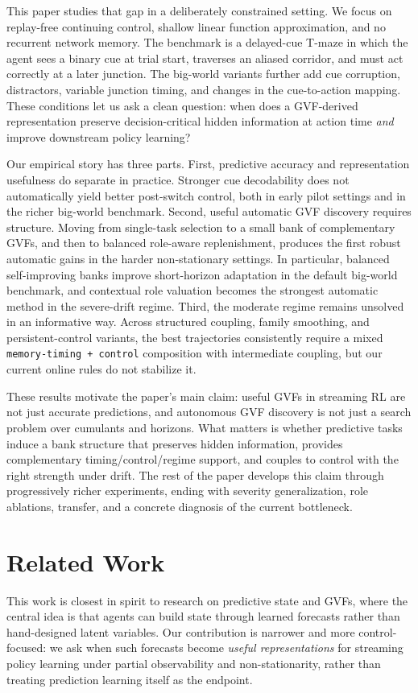 \documentclass[11pt]{article}
\begin{document}
This paper studies that gap in a deliberately constrained setting. We focus on replay-free continuing control, shallow linear function approximation, and no recurrent network memory. The benchmark is a delayed-cue T-maze in which the agent sees a binary cue at trial start, traverses an aliased corridor, and must act correctly at a later junction. The big-world variants further add cue corruption, distractors, variable junction timing, and changes in the cue-to-action mapping. These conditions let us ask a clean question: when does a GVF-derived representation preserve decision-critical hidden information at action time \emph{and} improve downstream policy learning?

Our empirical story has three parts. First, predictive accuracy and representation usefulness do separate in practice. Stronger cue decodability does not automatically yield better post-switch control, both in early pilot settings and in the richer big-world benchmark. Second, useful automatic GVF discovery requires structure. Moving from single-task selection to a small bank of complementary GVFs, and then to balanced role-aware replenishment, produces the first robust automatic gains in the harder non-stationary settings. In particular, balanced self-improving banks improve short-horizon adaptation in the default big-world benchmark, and contextual role valuation becomes the strongest automatic method in the severe-drift regime. Third, the moderate regime remains unsolved in an informative way. Across structured coupling, family smoothing, and persistent-control variants, the best trajectories consistently require a mixed \texttt{memory-timing + control} composition with intermediate coupling, but our current online rules do not stabilize it.

These results motivate the paper's main claim: useful GVFs in streaming RL are not just accurate predictions, and autonomous GVF discovery is not just a search problem over cumulants and horizons. What matters is whether predictive tasks induce a bank structure that preserves hidden information, provides complementary timing/control/regime support, and couples to control with the right strength under drift. The rest of the paper develops this claim through progressively richer experiments, ending with severity generalization, role ablations, transfer, and a concrete diagnosis of the current bottleneck.

\section{Related Work}
This work is closest in spirit to research on predictive state and GVFs, where the central idea is that agents can build state through learned forecasts rather than hand-designed latent variables. Our contribution is narrower and more control-focused: we ask when such forecasts become \emph{useful representations} for streaming policy learning under partial observability and non-stationarity, rather than treating prediction learning itself as the endpoint.
\end{document}
